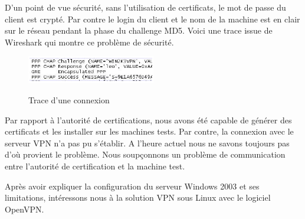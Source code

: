 D'un point de vue sécurité, sans l'utilisation de certificats, le mot de passe du client est crypté. Par contre le login du client et le nom de la machine est en clair sur le réseau pendant la phase du challenge MD5. 
Voici une trace issue de Wireshark qui montre ce problème de sécurité.

\begin{figure}[H]
	\begin{center}
		\includegraphics[width=0.5\textwidth]{partie_2/screen_windows/connexion.png}\\
	\end{center}
	\caption{Trace d'une connexion}
	\label{VPN_CONNEXION}
\end{figure}


Par rapport à l'autorité de certifications, nous avons été capable de générer des certificats et les installer sur les machines tests. Par contre, la connexion avec le serveur VPN n'a pas pu s'établir. A l'heure actuel nous ne savons toujours pas d'où provient le problème. Nous soupçonnons un problème de communication entre l'autorité de certification et la machine test.

Après avoir expliquer la configuration du serveur Windows 2003 et ses limitations, intéressons nous à la solution VPN sous Linux avec le logiciel OpenVPN.
 


